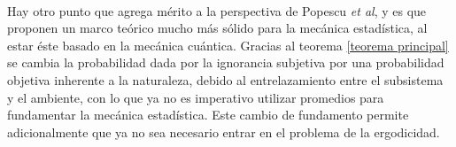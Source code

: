 \\
Hay otro punto que agrega mérito a la perspectiva de Popescu \textit{et al}, y es que proponen un marco teórico mucho más sólido para la mecánica estadística, al estar éste basado en la mecánica cuántica. Gracias al teorema \ref{teorema principal} se cambia la probabilidad dada por la ignorancia subjetiva por una probabilidad objetiva inherente a la naturaleza, debido al entrelazamiento entre el subsistema y el ambiente, con lo que ya no es imperativo utilizar promedios para fundamentar la mecánica estadística. Este cambio de fundamento permite adicionalmente que ya no sea necesario entrar en el problema de la ergodicidad. 




